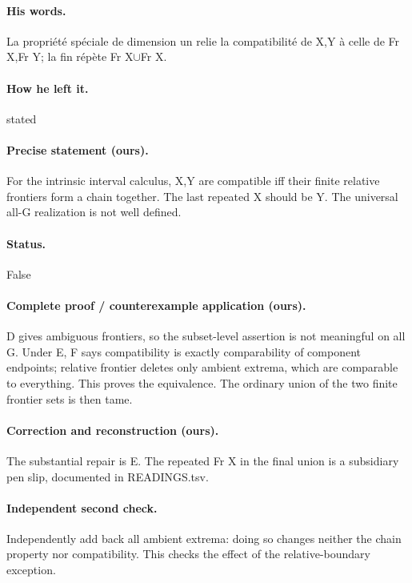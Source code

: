 \paragraph{His words.} La propriété spéciale de dimension un relie la compatibilité de X,Y à celle de Fr X,Fr Y; la fin répète Fr X\ensuremath{\cup}Fr X.

\paragraph{How he left it.} stated

\paragraph{Precise statement (ours).} For the intrinsic interval calculus, X,Y are compatible iff their finite relative frontiers form a chain together. The last repeated X should be Y. The universal all-G realization is not well defined.

\paragraph{Status.} False

\paragraph{Complete proof / counterexample application (ours).} D gives ambiguous frontiers, so the subset-level assertion is not meaningful on all G. Under E, F says compatibility is exactly comparability of component endpoints; relative frontier deletes only ambient extrema, which are comparable to everything. This proves the equivalence. The ordinary union of the two finite frontier sets is then tame.

\paragraph{Correction and reconstruction (ours).} The substantial repair is E. The repeated Fr X in the final union is a subsidiary pen slip, documented in READINGS.tsv.

\paragraph{Independent second check.} Independently add back all ambient extrema: doing so changes neither the chain property nor compatibility. This checks the effect of the relative-boundary exception.

